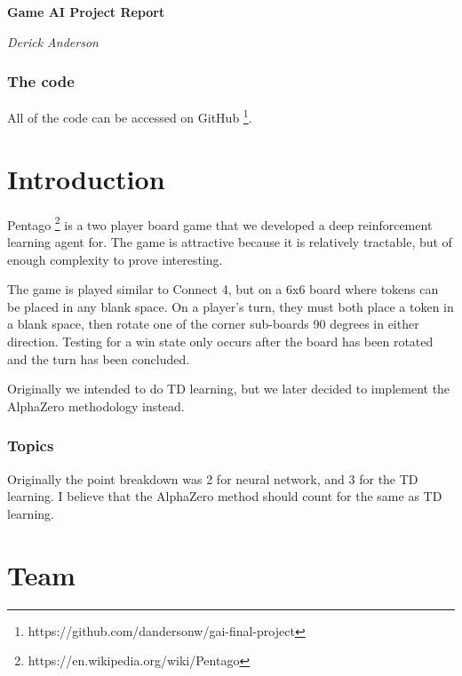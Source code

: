 \documentclass{article}
\begin{document}

\begin{center}
  \textbf{Game AI Project Report}

  \textit{Derick Anderson}
\end{center}

\subsubsection*{The code}

All of the code can be accessed on GitHub \footnote{https://github.com/dandersonw/gai-final-project}.

\section*{Introduction}

Pentago \footnote{https://en.wikipedia.org/wiki/Pentago} is a two player board
game that we developed a deep reinforcement learning agent for. The game is
attractive because it is relatively tractable, but of enough complexity to prove
interesting.

The game is played similar to Connect 4, but on a 6x6 board where tokens can be
placed in any blank space. On a player’s turn, they must both place a token in a
blank space, then rotate one of the corner sub-boards 90 degrees in either
direction. Testing for a win state only occurs after the board has been rotated
and the turn has been concluded.

Originally we intended to do TD learning, but we later decided to implement
the AlphaZero methodology instead.

\subsubsection*{Topics}

Originally the point breakdown was 2 for neural network,
and 3 for the TD learning.
I believe that the AlphaZero method should count for the same as TD learning.

\section*{Team}
\end{document}
